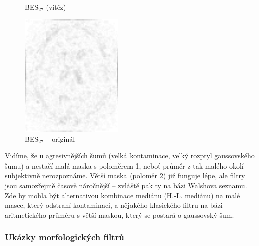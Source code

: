 \begin{figure}[h!]
\begin{minipage}[l]{0.5\textwidth}
            \caption{BES$_{27}$ (vítěz)}
        \end{minipage}
        \begin{minipage}[r]{0.5\textwidth}
            \center
            \includegraphics[width = 140pt]{src/8Appendix/final/5-30besD.png}
            \caption{BES$_{27}$ -- originál}
        \end{minipage}
    \end{figure}
    \newpage
    
    Vidíme, že u agresivnějších šumů (velká kontaminace, velký rozptyl gaussovského šumu) a nestačí malá maska s poloměrem 1, neboť průměr z tak malého okolí subjektivně nerozpoznáme. Větší maska (poloměr 2) již funguje lépe, ale filtry jsou samozřejmě časově náročnější -- zvláště pak ty na bázi Walshova seznamu. Zde by mohla být alternativou kombinace mediánu (H.-L. mediánu) na malé masce, který odstraní kontaminaci, a nějakého klasického filtru na bázi aritmetického průměru s větší maskou, který se postará o gaussovský šum.
     
     \subsubsection{Ukázky morfologických filtrů}
     
